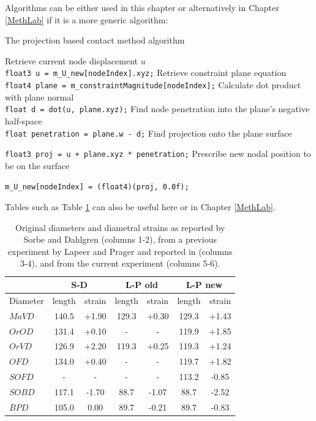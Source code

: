 \documentclass[a4paper, oneside, 11pt]{report}
\newcommand{\mi}{\mathit}
\begin{document}
Algorithms can be either used in this chapter or alternatively in Chapter \ref{MethLab} if it is a more generic algorithm:

\begin{algorithm}[th]
\caption{ The projection based contact method algorithm }
\begin{algorithmic}[1]
\STATE Retrieve current node displacement $u$
\\ \texttt{float3 u = m\_U\_new[nodeIndex].xyz;}
\STATE Retrieve constraint plane equation
\\ \texttt{float4 plane = m\_constraintMagnitude[nodeIndex];}
\STATE Calculate dot product with plane normal
\\ \texttt{float d = dot(u, plane.xyz);}
\STATE Find node penetration into the plane's negative half-space
\\ \texttt{float penetration = plane.w - d;}
	\STATE Find projection onto the plane surface
	
	\texttt{float3 proj = u + plane.xyz * penetration;}
	\STATE Prescribe new nodal position to be on the surface
	
	\texttt{m\_U\_new[nodeIndex] = (float4)(proj, 0.0f);}
\ENDIF
\end{algorithmic}
\end{algorithm}

Tables such as Table \ref{Res01} can also be useful here or in Chapter \ref{MethLab}.

\begin{table}[h]
\caption[]{Original diameters and diametral strains as reported by
  Sorbe and Dahlgren \cite{Sorbe:1983} (columns 1-2), from a previous 
  experiment by Lapeer and Prager and reported in \cite{Lapeer:2001}
  (columns 3-4), and from the current experiment (columns 5-6).}
\begin{center}
\begin{tabular}{|l|c|c||c|c||c|c|}\hline
& \multicolumn{2}{c||}{S-D} & \multicolumn{2}{c||}{L-P old} & \multicolumn{2}{c|}{L-P new} \\ \hline
Diameter & length & strain & length & strain & length & strain \\ \hline
$\mi{MaVD}$ & 140.5 & +1.90 & 129.3 & +0.30 & 129.3 & +1.43 \\
$\mi{OrOD}$ & 131.4 & +0.10 &   -   &  -    & 119.9 & +1.85 \\
$\mi{OrVD}$ & 126.9 & +2.20 & 119.3 & +0.25 & 119.3 & +1.24 \\
$\mi{OFD}$  & 134.0 & +0.40 &  -    &   -   & 119.7 & +1.82 \\ 
$\mi{SOFD}$ &  -    &   -   &  -    &   -   & 113.2 & -0.85 \\
$\mi{SOBD}$ & 117.1 & -1.70 &  88.7 & -1.07 &  88.7 & -2.52 \\
$\mi{BPD}$  & 105.0 &  0.00 &  89.7 & -0.21 &  89.7 & -0.83 \\ \hline
\end{tabular}
\label{Res01}
\end{center}
\end{table}
\end{document}

